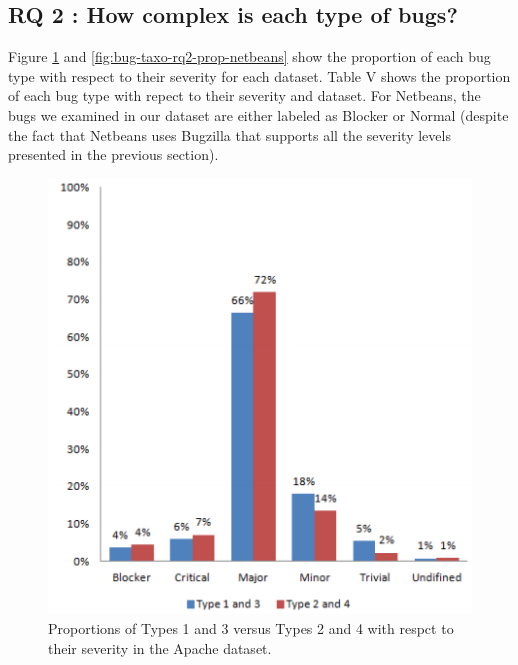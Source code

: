 \noindent{}

\subsection{RQ 2 : How complex is each type of bugs?}

Figure \ref{fig:bug-taxo-rq2-prop-apache} and \ref{fig:bug-taxo-rq2-prop-netbeans} show the proportion of each bug type with
respect to their severity for each dataset. Table V shows the
proportion of each bug type with repect to their severity and
dataset. For Netbeans, the bugs we examined in our dataset
are either labeled as Blocker or Normal (despite the fact that
Netbeans uses Bugzilla that supports all the severity levels
presented in the previous section).

\begin{figure}[h!]
  \centering
    \includegraphics[scale=0.6]{media/bug-taxo-rq2-prop-apache.png}
    \caption{Proportions of Types 1 and 3 versus Types 2 and 4 with respct to their severity in the Apache dataset.
    \label{fig:bug-taxo-rq2-prop-apache}}
\end{figure}

